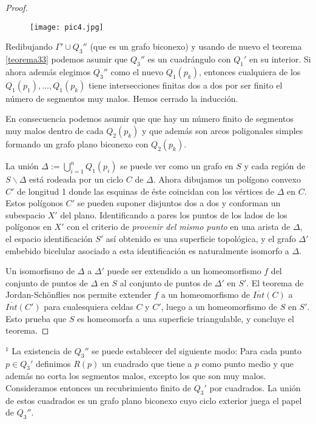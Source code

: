\documentclass[12pt,a4paper,oldfontcommands]{memoir}
\begin{document}
\begin{proof}
\begin{figure}[h]
\centering
\begin{minipage}[c]{\textwidth}
\centering
    \texttt{[image: pic4.jpg]}
\end{minipage}
\end{figure}
	
	Redibujando $\Gamma' \cup Q_{3}''$	(que es un grafo biconexo) y usando de nuevo el teorema \ref{teorema33} podemos asumir  que $Q_{3}''$ es un cuadrángulo con $Q_{1}'$ en su interior. Si ahora además elegimos $Q_{3}''$ como el nuevo $Q_{1}(p_k)$, entonces cualquiera de los $Q_{1}(p_1),..., Q_{1}(p_k)$ tiene intersecciones finitas dos a dos por ser finito el número de segmentos muy malos. Hemos cerrado la inducción.
 
	En consecuencia podemos asumir que que hay un número finito de segmentos muy malos dentro de cada $Q_{2}(p_k)$ y que además son arcos poligonales simples formando un grafo plano biconexo con $Q_{2}(p_k)$.

	La unión $\Delta:=\bigcup_{i = 1}^{n} Q_{1}(p_i)$ se puede ver como un grafo  en $S$ y cada región de $S \backslash \Delta$ está rodeada por un ciclo $C$ de $\Delta$. Ahora dibujamos un polígono convexo $C'$ de longitud 1 donde las esquinas de éste coincidan con los vértices de $\Delta$ en  $C$. Estos polígonos $C'$ se pueden suponer disjuntos dos a dos y conforman un subespacio $X'$ del plano. Identificando a pares los puntos de los lados de los polígonos en $X'$ con el criterio de {\em provenir del mismo punto} en una  arista de $\Delta$, el espacio identificación  $S'$ así obtenido es una superficie topológica, y el  grafo $\Delta'$ embebido bicelular asociado a esta identificación es naturalmente isomorfo a $\Delta$.

	Un isomorfismo de $\Delta$ a $\Delta'$ puede ser extendido a un homeomorfismo $f$ del conjunto de puntos de $\Delta$ en $S$ al conjunto de puntos de $\Delta'$ en $S'$. El teorema de Jordan-Schönflies nos permite extender $f$   a un homeomorfismo de $\overline{Int}(C)$ a $\overline{Int}(C')$ para cualesquiera celdas $C$ y $C'$, luego a un homeomorfismo de $S$ en $S'$. Esto prueba que $S$ es homeomorfa a una superficie triangulable, y concluye el teorema.
\end{proof}

	$^{1}$ La existencia de $Q_{3}''$ se puede establecer del siguiente modo: Para cada punto $p \in Q_{3}'$ definimos $R(p)$ un cuadrado que tiene a $p$ como punto medio y que además no corta los segmentos malos, excepto los que son muy malos. Consideramos entonces un recubrimiento finito de $Q_{3}'$ por cuadrados. La unión de estos cuadrados es un grafo plano biconexo cuyo ciclo exterior juega el papel de $Q_{3}''$.
\end{document}
